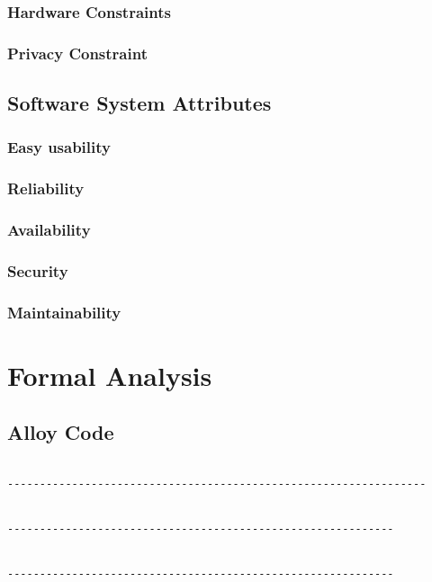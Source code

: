 \subsubsection{Hardware Constraints}

\subsubsection{Privacy Constraint}

\subsection{Software System Attributes}
\subsubsection{Easy usability}

\subsubsection{Reliability}

\subsubsection{Availability}

\subsubsection{Security}



\subsubsection{Maintainability}


\newpage
\section{Formal Analysis}
\subsection{Alloy Code}
\begin{lstlisting}[language=alloy]

-----------------------------------------------------------------


------------------------------------------------------------


------------------------------------------------------------
\end{lstlisting}
\pagestyle{plain}
